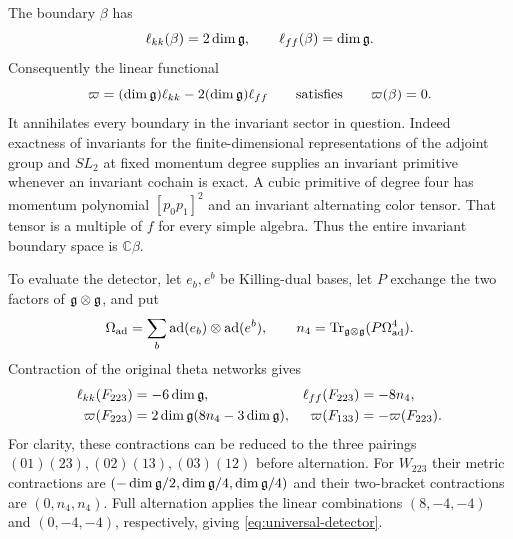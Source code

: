 The boundary $\beta$ has
\[
 \ell_{kk}(\beta)=2\dim\mathfrak g,\qquad
 \ell_{ff}(\beta)=\dim\mathfrak g.
\]
Consequently the linear functional
\[
 \varpi=(\dim\mathfrak g)\ell_{kk}-2(\dim\mathfrak g)\ell_{ff}
 \qquad\text{satisfies}\qquad \varpi(\beta)=0 .
\]
It annihilates every boundary in the invariant sector in question.
Indeed exactness of invariants for the finite-dimensional
representations of the adjoint group and $SL_2$ at fixed momentum degree supplies
an invariant primitive whenever an invariant cochain is exact.
A cubic primitive of degree four has momentum polynomial
$[p_0p_1]^2$ and an invariant alternating color tensor.
That tensor is a multiple of $f$ for every simple algebra.
Thus the entire invariant boundary space is $\mathbb C\beta$.

To evaluate the detector, let $e_b,e^b$ be Killing-dual bases,
let $P$ exchange the two factors of $\mathfrak g\otimes\mathfrak g$, and put
\[
 \Omega_{\mathrm{ad}}
   =\sum_b\operatorname{ad}(e_b)\otimes\operatorname{ad}(e^b),
 \qquad n_4=\operatorname{Tr}_{\mathfrak g\otimes\mathfrak g}(P\Omega_{\mathrm{ad}}^4).
\]
Contraction of the original theta networks gives
\begin{align}
 \ell_{kk}(F_{223})&=-6\dim\mathfrak g,&
 \ell_{ff}(F_{223})&=-8n_4,\notag\\
 \varpi(F_{223})&=2\dim\mathfrak g(8n_4-3\dim\mathfrak g),&
 \varpi(F_{133})&=-\varpi(F_{223}).
 \label{eq:universal-detector}
\end{align}
For clarity, these contractions can be reduced to the three
pairings $(01)(23),(02)(13),(03)(12)$ before alternation.
For $W_{223}$ their metric contractions are
$(-\dim\mathfrak g/2,\dim\mathfrak g/4,\dim\mathfrak g/4)$ and their two-bracket contractions
are $(0,n_4,n_4)$. Full alternation applies the linear combinations
$(8,-4,-4)$ and $(0,-4,-4)$, respectively, giving
\eqref{eq:universal-detector}.

